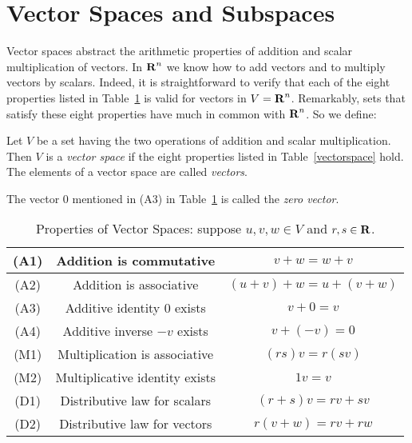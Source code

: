 \documentclass{ximera}
\begin{document}
\section{Vector Spaces and Subspaces} \label{S:5.1}

Vector spaces abstract the arithmetic properties of addition and
scalar multiplication of vectors.  In $\mbox{$\bf{R}$}^n$ we know how to add
vectors and to multiply vectors by scalars.  Indeed, it is
straightforward to verify that each of the eight
properties listed in Table~\ref{vectorspacelist} is valid for
vectors in $V=\mbox{$\bf{R}$}^n$.  Remarkably, sets that satisfy these eight
properties have much in common with $\mbox{$\bf{R}$}^n$.  So we define:
\begin{Def}  \label{vectorspace}
Let $V$ be a set having the two operations of addition and scalar
multiplication.  Then $V$ is a {\em vector space\/} if the eight
properties listed in Table~\ref{vectorspace} hold.  The elements
of a vector space are called {\em vectors}.
\end{Def} 

The vector $0$ mentioned in (A3) in Table~\ref{vectorspacelist}
is called the {\em zero vector}.

\begin{table}
\caption{Properties of Vector Spaces: suppose $u,v,w\in V$ and
$r,s\in\mbox{$\bf{R}$}$.}
\begin{center}
\begin{tabular}{|c|c|c|}
\hline
(A1) & Addition is commutative & $v+w=w+v$ \\
\hline
(A2) & Addition is associative & $(u+v)+w = u+(v+w)$ \\
\hline
(A3) & Additive identity $0$ exists & $v+0=v$ \\
\hline
(A4) & Additive inverse $-v$ exists & $v+(-v) = 0$ \\
\hline
(M1) & Multiplication is associative & $(rs)v = r(sv)$ \\
\hline
(M2) & Multiplicative identity exists & $1v=v$ \\
\hline
(D1) & Distributive law for scalars & $(r+s)v = rv+sv$ \\
\hline
(D2) & Distributive law for vectors & $r(v+w) = rv+rw$ \\
\hline
\end{tabular}
\end{center}  
 
 
\label{vectorspacelist}
\end{table}
\end{document}
